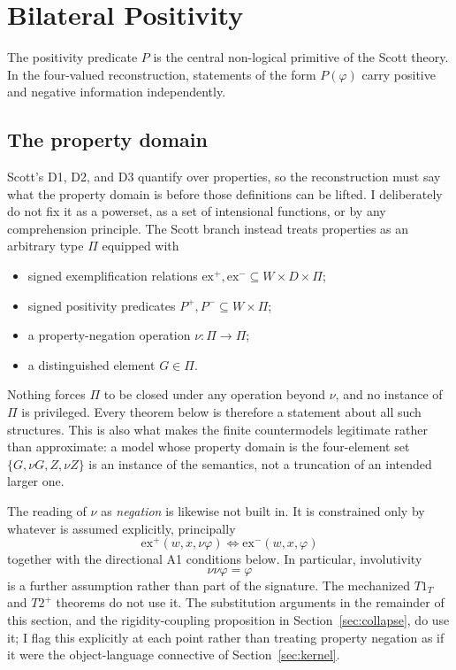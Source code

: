 \section{Bilateral Positivity}
\label{sec:positivity}

\statusestablished

The positivity predicate \(P\) is the central non-logical primitive of the Scott theory. In the four-valued reconstruction, statements of the form \(P(\varphi)\) carry positive and negative information independently.

\subsection{The property domain}
\label{sec:property-domain}

Scott's D1, D2, and D3 quantify over properties, so the reconstruction must say what the property domain is before those definitions can be lifted. I deliberately do not fix it as a powerset, as a set of intensional functions, or by any comprehension principle. The Scott branch instead treats properties as an arbitrary type \(\Pi\) equipped with

\begin{itemize}
  \item signed exemplification relations \(\mathrm{ex}^{+},\mathrm{ex}^{-}\subseteq W\times D\times\Pi\);
  \item signed positivity predicates \(P^{+},P^{-}\subseteq W\times\Pi\);
  \item a property-negation operation \(\nu:\Pi\to\Pi\);
  \item a distinguished element \(G\in\Pi\).
\end{itemize}

Nothing forces \(\Pi\) to be closed under any operation beyond \(\nu\), and no instance of \(\Pi\) is privileged. Every theorem below is therefore a statement about all such structures. This is also what makes the finite countermodels legitimate rather than approximate: a model whose property domain is the four-element set \(\{G,\nu G,Z,\nu Z\}\) is an instance of the semantics, not a truncation of an intended larger one.

The reading of \(\nu\) as \emph{negation} is likewise not built in. It is constrained only by whatever is assumed explicitly, principally
\[
  \mathrm{ex}^{+}(w,x,\nu\varphi)\iff\mathrm{ex}^{-}(w,x,\varphi)
\]
together with the directional A1 conditions below. In particular, involutivity
\[
  \nu\nu\varphi=\varphi
\]
is a further assumption rather than part of the signature. The mechanized \(T1_T\) and \(T2^+\) theorems do not use it. The substitution arguments in the remainder of this section, and the rigidity-coupling proposition in Section~\ref{sec:collapse}, do use it; I flag this explicitly at each point rather than treating property negation as if it were the object-language connective of Section~\ref{sec:kernel}.

